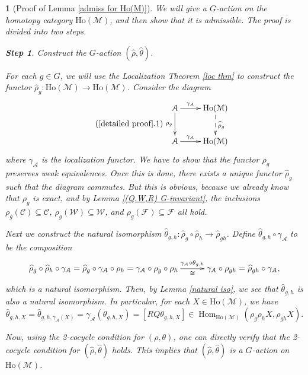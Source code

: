 \documentclass[12pt,twoside]{amsart}
\theoremstyle{bfupright head,slanted body}
\theoremstyle{bfupright head,upright body}
\newtheorem{bfhpg}[res]{}               \newtheorem*{bfhpg*}{}
\theoremstyle{fixed bf head,slanted body}
\theoremstyle{fixed bf head,upright body}
\theoremstyle{numbered paragraph}
\numberwithin{equation}{res}
\newcommand{\calC}{\mathcal{C}}
\newcommand{\calW}{\mathcal{W}}
\newcommand{\calF}{\mathcal{F}}
\newcommand{\calA}{\mathcal{A}}
\newcommand{\calM}{\mathcal{M}}
\newcommand{\Ho}{\mathrm{Ho}}
\newcommand{\Hom}{\operatorname{Hom}}
\begin{document}
\begin{bfhpg}[Proof of Lemma \ref{admiss for Ho(M)}]\label{detailed proof}
We will give a $G$-action on the homotopy category $\Ho(\calM)$, and then show that it is admissible. The proof is divided into two steps.

\vspace{1ex}\textbf{Step 1}. Construct the $G$-action $(\widehat{\rho}, \widehat{\theta})$.

For each $g \in G$, we will use the Localization Theorem \ref{loc thm} to construct the functor $\widehat{\rho}_g : \Ho(\calM) \to \Ho(\calM)$.
Consider the diagram
\begin{equation*} \label{gamma diagram} \tag{\ref{detailed proof}.1}
\begin{gathered}
\xymatrix{
  \calA
\ar[d]_-{\rho_g}
\ar[r]^-{\gamma_{\calA}}
& \Ho(\calM)
\ar@{-->}[d]^-{\widehat{\rho}_g}  \\
  \calA
\ar[r]^-{\gamma_{\calA}}
& \Ho(\calM)    }
\end{gathered}
\end{equation*}
where $\gamma_{\calA}$ is the localization functor.
We have to show that the functor $\rho_g$ preserves weak equivalences.
Once this is done, there exists a unique functor $\widehat{\rho}_g$ such that the diagram commutes.
But this is obvious, because we already know that $\rho_g$ is exact, and by Lemma \ref{(Q,W,R) G-invariant}, the inclusions $\rho_g (\calC) \subseteq \calC$, $\rho_g (\calW) \subseteq \calW$, and $\rho_g (\calF) \subseteq \calF$ all hold.

Next we construct the natural isomorphism $\widehat{\theta}_{g,h}: \widehat{\rho}_g \circ \widehat{\rho}_h \to \widehat{\rho}_{gh}$.
Define $\widehat{\theta}_{g,h} \circ \gamma_{\calA}$ to be the composition
\[
\xymatrix@C=1CM{
   \widehat{\rho}_g \circ \widehat{\rho}_h \circ \gamma_{\calA}
=  \widehat{\rho}_g \circ \gamma_{\calA} \circ \rho_h
=  \gamma_{\calA} \circ \rho_g \circ \rho_h
\ar[r]^-{\gamma_{\calA} \circ \theta_{g,h}}_-{\cong}
&  \gamma_{\calA} \circ \rho_{gh}
=  \widehat{\rho}_{gh} \circ \gamma_{\calA},
}
\]
which is a natural isomorphism.
Then, by Lemma \ref{natural iso}, we see that $\widehat{\theta}_{g,h}$ is also a natural isomorphism.
In particular, for each $X \in \Ho(\calM)$, we have
\[
   \widehat{\theta}_{g,h,X}
=  \widehat{\theta}_{g,h,\gamma_{\calA}(X)}
=  \gamma_{\calA}(\theta_{g,h,X})
=  [RQ \theta_{g,h,X}] \in \Hom_{\Ho(\calM)}(\rho_g \rho_h X, \rho_{gh} X).
\]

Now, using the 2-cocycle condition for $(\rho, \theta)$, one can directly verify that the 2-cocycle condition for $(\widehat{\rho}, \widehat{\theta})$ holds.
This implies that $(\widehat{\rho}, \widehat{\theta})$ is a $G$-action on $\Ho(\calM)$.


\end{bfhpg}
\end{document}
